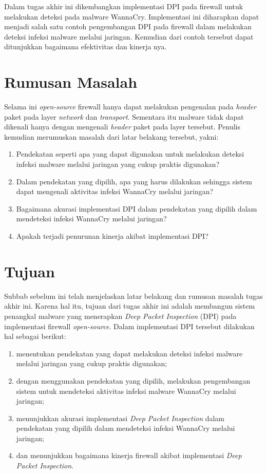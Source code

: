 Dalam tugas akhir ini dikembangkan implementasi DPI pada firewall untuk melakukan deteksi pada malware WannaCry. Implementasi ini diharapkan dapat menjadi salah satu contoh pengembangan DPI pada firewall dalam melakukan deteksi infeksi malware melalui jaringan. Kemudian dari contoh tersebut dapat ditunjukkan bagaimana efektivitas dan kinerja nya.

\section{Rumusan Masalah}

Selama ini \textit{open-source} firewall hanya dapat melakukan pengenalan pada \textit{header} paket pada layer \textit{network} dan \textit{transport}. Sementara itu malware tidak dapat dikenali hanya dengan mengenali \textit{header} paket pada layer tersebut. Penulis kemudian merumuskan masalah dari latar belakang tersebut, yakni:

\begin{enumerate}
	\item Pendekatan seperti apa yang dapat digunakan untuk melakukan deteksi infeksi malware melalui jaringan yang cukup praktis digunakan?
	\item Dalam pendekatan yang dipilih, apa yang harus dilakukan sehingga sistem dapat mengenali aktivitas infeksi WannaCry melalui jaringan?
	\item Bagaimana akurasi implementasi DPI dalam pendekatan yang dipilih dalam mendeteksi infeksi WannaCry melalui jaringan?
	\item Apakah terjadi penurunan kinerja akibat implementasi DPI?
\end{enumerate}

\section{Tujuan}

Subbab sebelum ini telah menjelaskan latar belakang dan rumusan masalah tugas akhir ini. Karena hal itu, tujuan dari tugas akhir ini adalah membangun sistem penangkal malware yang menerapkan \textit{Deep Packet Inspection} (DPI) pada implementasi firewall \textit{open-source}. Dalam implementasi DPI tersebut dilakukan hal sebagai berikut:

\begin{enumerate}
	\item menentukan pendekatan yang dapat melakukan deteksi infeksi malware melalui jaringan yang cukup praktis digunakan;
	\item dengan menggunakan pendekatan yang dipilih, melakukan pengembangan sistem untuk mendeteksi aktivitas infeksi malware WannaCry melalui jaringan;
	\item menunjukkan akurasi implementasi \textit{Deep Packet Inspection} dalam pendekatan yang dipilih dalam mendeteksi infeksi WannaCry melalui jaringan;
	\item dan menunjukkan bagaimana kinerja firewall akibat implementasi \textit{Deep Packet Inspection}.
\end{enumerate}

